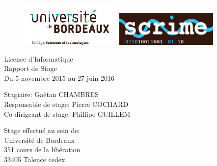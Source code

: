 \documentclass[a4paper, 12pt]{report}
\begin{document}
\begin{titlepage}

\begin{figure}[t]
\begin{center}
\includegraphics[width=0.45\textwidth]{ub.png}
\includegraphics[width=0.45\textwidth]{scrime.png}
\end{center}
\vspace{1cm}
\end{figure}

\begin{center}
{\LARGE Licence d'Informatique\\Rapport de Stage\\Du 5 novembre 2015 au 27 juin 2016\\}
\end{center}

\begin{center}
\vspace{1.4cm}
\end{center}
\vspace{1.4cm}

\begin{description}
\item[{\LARGE Stagiaire:}{ Gaëtan CHAMBRES}]
\item[{\LARGE Responsable de stage:}{ Pierre COCHARD}]
\vspace{0.5cm}
\item[{\LARGE Co-dirigeant de stage:}{ Phillipe GUILLEM}]
\end{description}

\vspace{1.4cm}
\begin{description}
\item[Stage effectué au sein de:]
\item[Université de Bordeaux]
\item[351 cours de la libération]
\item[33405 Talence cedex]
\end{description}



\end{titlepage}
\end{document}
